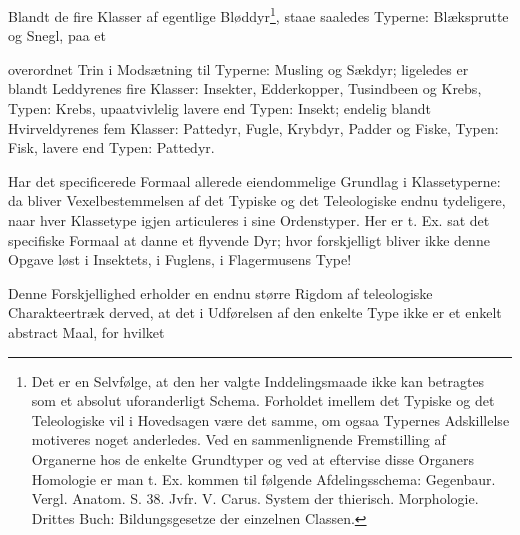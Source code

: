 \documentclass[12pt,a4paper]{book}
\begin{document}
Blandt de fire Klasser af egentlige Bløddyr\footnote{Det er en Selvfølge, at den
her valgte Inddelingsmaade ikke kan betragtes som et absolut uforanderligt
Schema. Forholdet imellem det Typiske og det Teleologiske vil i Hovedsagen være
det samme, om ogsaa Typernes Adskillelse motiveres noget anderledes. Ved en
sammenlignende Fremstilling af Organerne hos de enkelte Grundtyper og ved at
eftervise disse Organers Homologie er man t. Ex. kommen til følgende
Afdelingsschema:
Gegenbaur. Vergl. Anatom. S. 38. Jvfr. V. Carus. System der thierisch.
Morphologie. Drittes Buch: Bildungsgesetze der einzelnen Classen.}, staae
saaledes Typerne: Blæksprutte og Snegl, paa et

overordnet Trin i Modsætning til Typerne: Musling og Sækdyr; ligeledes er blandt
Leddyrenes fire Klasser: Insekter, Edderkopper, Tusindbeen og Krebs, Typen:
Krebs, upaatvivlelig lavere end Typen: Insekt; endelig blandt Hvirveldyrenes fem
Klasser: Pattedyr, Fugle, Krybdyr, Padder og Fiske, Typen: Fisk, lavere end
Typen: Pattedyr.

Har det specificerede Formaal allerede eiendommelige Grundlag i Klassetyperne:
da bliver Vexelbestemmelsen af det Typiske og det Teleologiske endnu tydeligere,
naar hver Klassetype igjen articuleres i sine Ordenstyper. Her er t. Ex. sat det
specifiske Formaal at danne et flyvende Dyr; hvor forskjelligt bliver ikke denne
Opgave løst i Insektets, i Fuglens, i Flagermusens Type!

Denne Forskjellighed erholder en endnu større Rigdom af teleologiske
Charakteertræk derved, at det i Udførelsen af den enkelte Type ikke er et enkelt
abstract Maal, for hvilket
\end{document}
